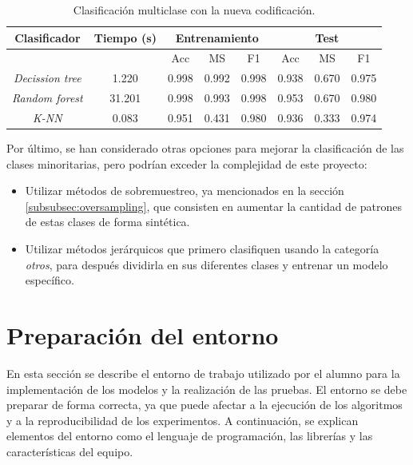 \begin{table}[th]
	\centering
	\begin{tabular}{ |c|c|c|c|c|c|c|c| }
		\hline
		\rowcolor{LightCyan}
		Clasificador & Tiempo (s) & \multicolumn{3}{c|}{Entrenamiento} & \multicolumn{3}{c|}{Test} \\
		\hline
		\rowcolor{LightCyan}
		&            & Acc & MS & F1 & Acc & MS & F1 \\
		\hline
		\textit{Decission tree} & 1.220  & 0.998 & 0.992 & 0.998 & 0.938 & 0.670 & 0.975 \\
		\textit{Random forest}  & 31.201 & 0.998 & 0.993 & 0.998 & 0.953 & 0.670 & 0.980 \\
		\textit{K-NN}           & 0.083  & 0.951 & 0.431 & 0.980 & 0.936 & 0.333 & 0.974 \\
		\hline
	\end{tabular}
	\caption{Clasificación multiclase con la nueva codificación.}
	\label{tabla:multi_new}
\end{table}

\vspace{1em}

Por último, se han considerado otras opciones para mejorar la clasificación de las clases minoritarias, pero podrían exceder la complejidad de este proyecto:

\begin{itemize}
	\item Utilizar métodos de sobremuestreo, ya mencionados en la sección \ref{subsubsec:oversampling}, que consisten en aumentar la cantidad de patrones de estas clases de forma sintética.
	\item Utilizar métodos jerárquicos que primero clasifiquen usando la categoría \textit{otros}, para después dividirla en sus diferentes clases y entrenar un modelo específico.
\end{itemize}

\section{Preparación del entorno}
\label{sec:prep_entorno}

En esta sección se describe el entorno de trabajo utilizado por el alumno para la implementación de los modelos y la realización de las pruebas. El entorno se debe preparar de forma correcta, ya que puede afectar a la ejecución de los algoritmos y a la reproducibilidad de los experimentos. A continuación, se explican elementos del entorno como el lenguaje de programación, las librerías y las características del equipo.

